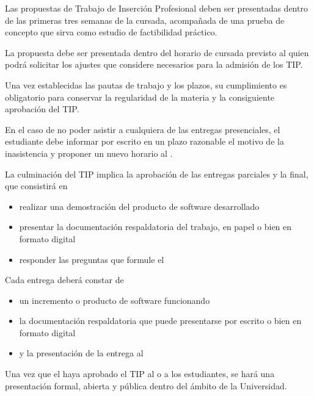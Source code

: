 \articulo Las propuestas de Trabajo de Inserción Profesional deben ser presentadas
dentro de las primeras tres semanas de la cursada, acompañada de una prueba de concepto
que sirva como estudio de factibilidad práctico.

\articulo La propuesta debe ser presentada dentro del horario de cursada previsto al \profesorTIP{}
quien podrá solicitar los ajustes que considere necesarios para la admisión de los TIP. 



\articulo Una vez establecidas las pautas de trabajo y los plazos, 
su cumplimiento es obligatorio para conservar la regularidad de la materia y la consiguiente
aprobación del TIP.

\articulo En el caso de no poder asistir a cualquiera de las entregas presenciales, el estudiante 
debe informar por escrito en un plazo razonable el motivo de la inasistencia y proponer un nuevo 
horario al \profesorTIP{}.


\articulo La culminación del TIP implica la aprobación de las entregas parciales y la final,
que consistirá en 
\begin{itemize}
 \item realizar una demostración del producto de software desarrollado
 \item presentar la documentación respaldatoria del trabajo, en papel o bien en formato digital
 \item responder las preguntas que formule el \profesorTIP{}
\end{itemize}


\articulo Cada entrega deberá constar de
\begin{itemize}
 \item un incremento o producto de software funcionando
 \item la documentación respaldatoria que puede presentarse por escrito o bien en formato digital
 \item y la presentación de la entrega al \profesorTIP{}
\end{itemize}


\articulo Una vez que el \profesorTIP{} haya aprobado el TIP al o a los estudiantes, 
se hará una presentación formal, abierta y pública dentro del ámbito de la Universidad. 

